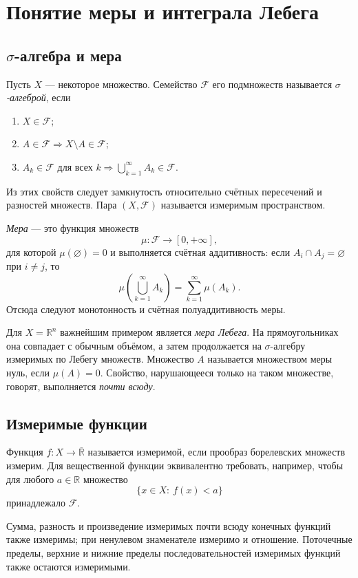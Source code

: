 \section{Понятие меры и интеграла Лебега}
\label{sec:measure-lebesgue-integral}

\subsection[Сигма-алгебра и мера]{$\sigma$-алгебра и мера}

Пусть $X$ --- некоторое множество. Семейство $\mathcal F$ его подмножеств
называется \emph{$\sigma$-алгеброй}, если
\begin{enumerate}
    \item $X\in\mathcal F$;
    \item $A\in\mathcal F\Rightarrow X\setminus A\in\mathcal F$;
    \item $A_k\in\mathcal F$ для всех $k\Rightarrow
          \displaystyle\bigcup_{k=1}^{\infty}A_k\in\mathcal F$.
\end{enumerate}
Из этих свойств следует замкнутость относительно счётных пересечений и
разностей множеств. Пара $(X,\mathcal F)$ называется измеримым пространством.

\emph{Мера} --- это функция множеств
\[
    \mu:\mathcal F\to[0,+\infty],
\]
для которой $\mu(\varnothing)=0$ и выполняется счётная аддитивность: если
$A_i\cap A_j=\varnothing$ при $i\neq j$, то
\[
    \mu\!\left(\bigcup_{k=1}^{\infty}A_k\right)
    =\sum_{k=1}^{\infty}\mu(A_k).
\]
Отсюда следуют монотонность и счётная полуаддитивность меры.

Для $X=\mathbb R^n$ важнейшим примером является \emph{мера Лебега}. На
прямоугольниках она совпадает с обычным объёмом, а затем продолжается на
$\sigma$-алгебру измеримых по Лебегу множеств. Множество $A$ называется
множеством меры нуль, если $\mu(A)=0$. Свойство, нарушающееся только на таком
множестве, говорят, выполняется \emph{почти всюду}.

\subsection{Измеримые функции}

Функция $f:X\to\overline{\mathbb R}$ называется измеримой, если прообраз
борелевских множеств измерим. Для вещественной функции эквивалентно требовать,
например, чтобы для любого $a\in\mathbb R$ множество
\[
    \{x\in X:\ f(x)<a\}
\]
принадлежало $\mathcal F$.

Сумма, разность и произведение измеримых почти всюду конечных функций также
измеримы; при ненулевом знаменателе измеримо и отношение. Поточечные пределы,
верхние и нижние пределы последовательностей измеримых функций также остаются
измеримыми.

